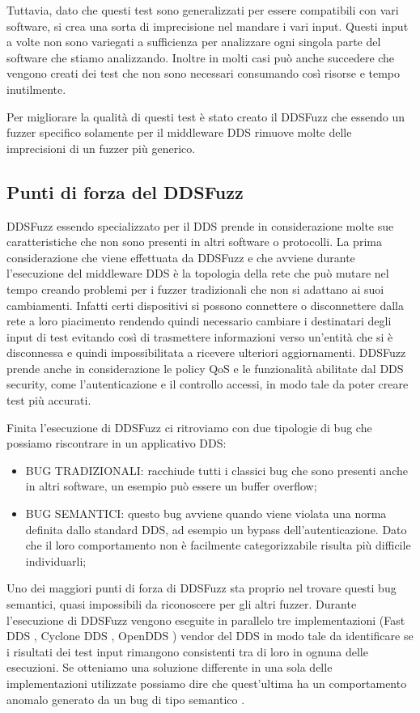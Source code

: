 Tuttavia, dato che questi test sono generalizzati per essere compatibili
con vari software, si crea una sorta di imprecisione nel mandare i vari 
input. Questi input a volte non sono variegati a sufficienza 
per analizzare ogni singola parte del software che stiamo analizzando.
Inoltre in molti casi può anche succedere che vengono creati
dei test che non sono necessari consumando
così risorse e tempo inutilmente.

Per migliorare la qualità di questi test è stato 
creato il DDSFuzz che essendo un fuzzer specifico solamente per 
il middleware DDS rimuove molte delle imprecisioni di un fuzzer 
più generico.

\subsection{Punti di forza del DDSFuzz}
DDSFuzz essendo specializzato per il DDS prende in considerazione 
molte sue caratteristiche che non sono presenti in altri software
o protocolli. La prima considerazione che viene 
effettuata da DDSFuzz e 
che avviene durante l'esecuzione del middleware DDS è
la topologia della rete che può mutare nel tempo creando problemi per i
fuzzer tradizionali che non si adattano ai suoi cambiamenti. Infatti certi
dispositivi si possono connettere o disconnettere dalla rete a loro 
piacimento rendendo quindi necessario cambiare i destinatari 
degli input di test 
evitando così di trasmettere informazioni verso un'entità 
che si è disconnessa e quindi impossibilitata a ricevere ulteriori
aggiornamenti. DDSFuzz prende anche in considerazione le
policy QoS e 
le funzionalità abilitate dal DDS security, come
l'autenticazione e il controllo accessi, in modo tale da
poter creare test più accurati. 

Finita l'esecuzione di DDSFuzz ci ritroviamo con due tipologie
di bug che possiamo riscontrare in un applicativo DDS:
\begin{itemize}
    \item BUG TRADIZIONALI: racchiude tutti i classici bug 
    che sono presenti anche in altri software, un esempio può 
    essere un buffer overflow;
    \item BUG SEMANTICI: questo bug avviene quando viene violata
    una norma definita dallo standard DDS,
    ad esempio un bypass dell'autenticazione. 
    Dato che il loro comportamento
    non è facilmente categorizzabile risulta più difficile individuarli;
\end{itemize}
Uno dei maggiori punti di forza di DDSFuzz sta proprio nel trovare
questi bug semantici, quasi impossibili da riconoscere per gli altri 
fuzzer. Durante l'esecuzione di DDSFuzz vengono eseguite in parallelo 
tre implementazioni (Fast DDS \cite{FastDDS}, Cyclone DDS \cite{CycloneDDS}, 
OpenDDS \cite{OpenDDS1}) vendor 
del DDS in modo tale da identificare
se i risultati dei test input rimangono consistenti tra di loro in 
ognuna delle esecuzioni. 
Se otteniamo una soluzione differente in una sola 
delle implementazioni utilizzate possiamo dire che quest'ultima ha un 
comportamento anomalo generato da un bug di tipo semantico 
\cite{10.1145/3691620.3695073}. 

